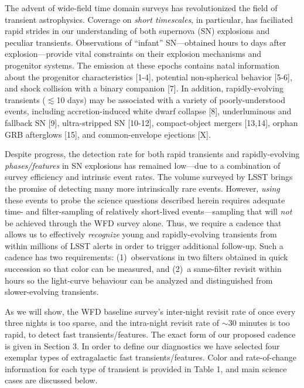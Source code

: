 \documentclass[12pt, letterpaper]{article}
\begin{document}
The advent of wide-field time domain surveys has revolutionized the field of transient astrophysics. Coverage on \emph{short timescales}, in particular, has faciliated rapid strides in our understanding of both supernova (SN) explosions and peculiar transients. Observations of ``infant'' SN---obtained hours to days after explosion---provide vital constraints on their explosion mechanisms and progenitor systems. The emission at these epochs contains natal information about the progenitor characteristics [1-4], potential non-spherical behavior [5-6], and shock collision with a binary companion [7]. In addition, rapidly-evolving transients ($\lesssim$10 days) may be associated with a variety of poorly-understood events, including accretion-induced white dwarf collapse [8], underluminous and fallback SN [9], ultra-stripped SN [10-12], compact-object mergers [13,14], orphan GRB afterglows [15], and common-envelope ejections [X].


Despite progress, the detection rate for both rapid transients and rapidly-evolving \emph{phases/features} in SN explosions has remained low---due to a combination of survey efficiency and intrinsic event rates. The volume surveyed by LSST brings the promise of detecting many more intrinsically rare events. However, \emph{using} these events to probe the science questions described herein requires adequate time- and filter-sampling of relatively short-lived events---sampling that will \emph{not} be achieved through the WFD survey alone. Thus, we require a cadence that allows us to effectively \emph{recognize} young and rapidly-evolving transients from within millions of LSST alerts in order to trigger additional follow-up. Such a cadence has two requirements: (1)~observations in two filters obtained in quick succession so that color can be measured, and (2)~a same-filter revisit within hours so the light-curve behaviour can be analyzed and distinguished from slower-evolving transients. 


As we will show, the WFD baseline survey's inter-night revisit rate of once every three nights is too sparse, and the intra-night revisit rate of $\sim$30 minutes is too rapid, to detect  fast transients/features. The exact form of our proposed cadence is given in Section 3. In order to define our diagnostics we have selected four exemplar types of extragalactic fast transients/features. Color and rate-of-change information for each type of transient is provided in Table 1, and main science cases are discussed below.
\end{document}
